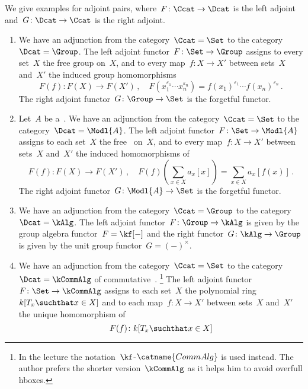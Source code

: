 \begin{example}
  We give examples for adjoint pairs, where~$F \colon \Ccat \to \Dcat$ is the left adjoint and~$G \colon \Dcat \to \Ccat$ is the right adjoint.
  \begin{enumerate}
    \item
      We have an adjunction from the category~$\Ccat = \Set$ to the category~$\Dcat = \Group$.
      The left adjoint functor~$F \colon \Set \to \Group$ assigns to every set~$X$ the free group on~$X$, and to every map~$f \colon X \to X'$ between sets~$X$ and~$X'$ the induced group homomorphisms
      \[
                F(f)
        \colon  F(X)
        \to     F(X') \,,
        \quad   F(x_1^{\varepsilon_1} \dotsm x_n^{\varepsilon_n})
        =       f(x_1)^{\varepsilon_1} \dotsm f(x_n)^{\varepsilon_n} \,.
      \]
      The right adjoint functor~$G \colon \Group \to \Set$ is the forgetful functor.
    \item
      Let~$A$ be a~{\kalg}.
      We have an adjunction from the category~$\Ccat = \Set$ to the category~$\Dcat = \Modl{A}$.
      The left adjoint functor~$F \colon \Set \to \Modl{A}$ assigns to each set~$X$ the free~{} on~$X$, and to every map~$f \colon X \to X'$ between sets~$X$ and~$X'$ the induced homomorphisms of~{}
      \[
                F(f)
        \colon  F(X)
        \to     F(X') \,,
        \quad   F(f)\left( \sum_{x \in X} a_x [x] \right)
        =       \sum_{x \in X} a_x [f(x)] \,.
      \]
      The right adjoint functor~$G \colon \Modl{A} \to \Set$ is the forgetful functor.
    \item
      We have an adjunction from the category~$\Ccat = \Group$ to the category~$\Dcat = \kAlg$.
      The left adjoint functor~$F \colon \Group \to \kAlg$ is given by the group algebra functor~$F = \kf[-]$ and the right functor~$G \colon \kAlg \to \Group$ is given by the unit group functor~$G = (-)^\times$.
    \item
      We have an adjunction from the category~$\Ccat = \Set$ to the category~$\Dcat = \kCommAlg$ of commutative~{\kalgs}.%
      \footnote{In the lecture the notation~$\kf$\nobreakdash-$\catname{CommAlg}$ is used instead.
      The author prefers the shorter version~$\kCommAlg$ as it helps him to avoid overfull hboxes.}
      The left adjoint functor~$F \colon \Set \to \kCommAlg$ assigns to each set~$X$ the polynomial ring~$k[T_x \suchthat x \in X]$ and to each map~$f \colon X \to X'$ between sets~$X$ and~$X'$ the unique homomorphism of~{\kalgs}
      \[
                F(f)
        \colon  k[T_x \suchthat x \in X]
\]
\end{enumerate}
\end{example}
